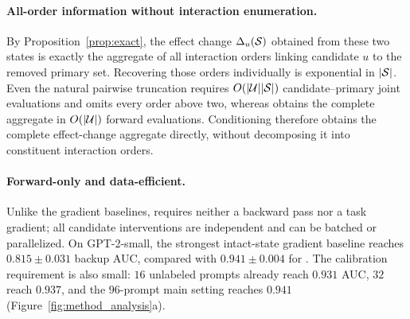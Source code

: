 \paragraph{All-order information without interaction enumeration.}
By Proposition~\ref{prop:exact}, the effect change
$\Delta_u(\mathcal{S})$ obtained from these two states is exactly the aggregate of
all interaction orders linking candidate $u$ to the removed primary set.
Recovering those orders individually is exponential in $|\mathcal{S}|$.
Even the natural pairwise truncation requires
$O(|\mathcal{U}||\mathcal{S}|)$ candidate--primary joint evaluations and omits every
order above two, whereas \coax obtains the complete aggregate in
$O(|\mathcal{U}|)$ forward evaluations.
Conditioning therefore obtains the complete effect-change aggregate directly,
without decomposing it into constituent interaction orders.

\paragraph{Forward-only and data-efficient.}
Unlike the gradient baselines, \coax requires neither a backward pass nor a
task gradient; all candidate interventions are independent and can be batched
or parallelized.
On GPT-2-small, the strongest intact-state gradient baseline reaches
$0.815\pm0.031$ backup AUC, compared with $0.941\pm0.004$ for \coax.
The calibration requirement is also small: $16$ unlabeled prompts already
reach $0.931$ AUC, $32$ reach $0.937$, and the $96$-prompt main setting reaches
$0.941$ (Figure~\ref{fig:method_analysis}a).

